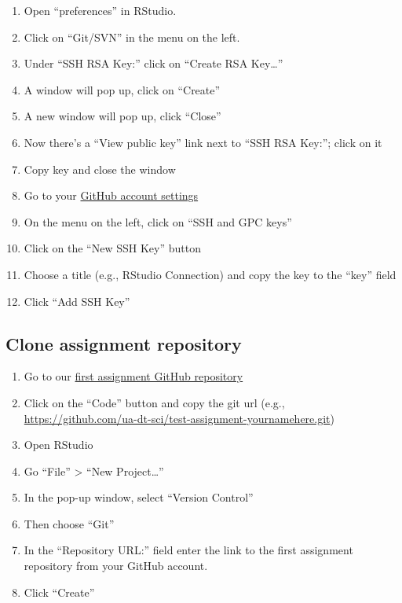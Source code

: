 \documentclass[
]{book}
\begin{document}
\begin{enumerate}
\def\labelenumi{\arabic{enumi}.}
\item
  Open ``preferences'' in RStudio.
\item
  Click on ``Git/SVN'' in the menu on the left.
\item
  Under ``SSH RSA Key:'' click on ``Create RSA Key\ldots{}''
\item
  A window will pop up, click on ``Create''
\item
  A new window will pop up, click ``Close''
\item
  Now there's a ``View public key'' link next to ``SSH RSA Key:''; click on it
\item
  Copy key and close the window
\item
  Go to your \href{https://github.com/settings/profile}{GitHub account settings}
\item
  On the menu on the left, click on ``SSH and GPC keys''
\item
  Click on the ``New SSH Key'' button
\item
  Choose a title (e.g., RStudio Connection) and copy the key to the ``key'' field
\item
  Click ``Add SSH Key''
\end{enumerate}

\hypertarget{clone-assignment-repository}{%
\subsection{Clone assignment repository}\label{clone-assignment-repository}}

\begin{enumerate}
\def\labelenumi{\arabic{enumi}.}
\item
  Go to our \href{https://classroom.github.com/a/zjVO8fZw}{first assignment GitHub repository}
\item
  Click on the ``Code'' button and copy the git url (e.g., \url{https://github.com/ua-dt-sci/test-assignment-yournamehere.git})
\item
  Open RStudio
\item
  Go ``File'' \textgreater{} ``New Project\ldots{}''
\item
  In the pop-up window, select ``Version Control''
\item
  Then choose ``Git''
\item
  In the ``Repository URL:'' field enter the link to the first assignment repository from your GitHub account.
\item
  Click ``Create''
\end{enumerate}
\end{document}
